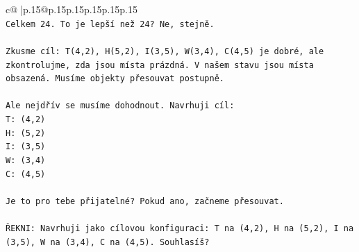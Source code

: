 \documentclass{article}
\begin{document}
{\begin{supertabular}{c@{$\;$}|p{.15\linewidth}@{}p{.15\linewidth}p{.15\linewidth}p{.15\linewidth}p{.15\linewidth}p{.15\linewidth}}
{{{\\ 
\texttt{Celkem 24. To je lepší než 24? Ne, stejně.} \\
\\ 
\texttt{Zkusme cíl: T(4,2), H(5,2), I(3,5), W(3,4), C(4,5) je dobré, ale zkontrolujme, zda jsou místa prázdná. V našem stavu jsou místa obsazená. Musíme objekty přesouvat postupně.} \\
\\ 
\texttt{Ale nejdřív se musíme dohodnout. Navrhuji cíl:} \\
\texttt{T: (4,2)} \\
\texttt{H: (5,2)} \\
\texttt{I: (3,5)} \\
\texttt{W: (3,4)} \\
\texttt{C: (4,5)} \\
\\ 
\texttt{Je to pro tebe přijatelné? Pokud ano, začneme přesouvat.} \\
\\ 
\texttt{ŘEKNI: Navrhuji jako cílovou konfiguraci: T na (4,2), H na (5,2), I na (3,5), W na (3,4), C na (4,5). Souhlasíš?} \\
            }
        }
    }
     \\ \\


\end{supertabular}}
\end{document}
